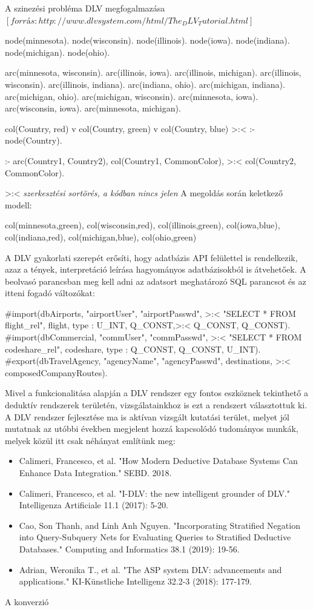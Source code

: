 A szinezési probléma DLV  megfogalmazása $[forrás: http://www.dlvsystem.com/html/The_DLV_Tutorial.html]$
\begin{cpp}
node(minnesota).
node(wisconsin).
node(illinois).
node(iowa).
node(indiana).
node(michigan).
node(ohio).

arc(minnesota, wisconsin).
arc(illinois, iowa).
arc(illinois, michigan).
arc(illinois, wisconsin).
arc(illinois, indiana).
arc(indiana, ohio).
arc(michigan, indiana).
arc(michigan, ohio).
arc(michigan, wisconsin).
arc(minnesota, iowa).
arc(wisconsin, iowa).
arc(minnesota, michigan).

col(Country, red) v col(Country, green) v col(Country, blue) >:<
 :- node(Country).

:- arc(Country1, Country2), col(Country1, CommonColor), >:<
col(Country2, CommonColor). 
\end{cpp}
>:<\textit{ szerkesztési sortörés, a kódban nincs jelen}
A megoldás során keletkező modell:
\begin{cpp}
{col(minnesota,green), col(wisconsin,red), col(illinois,green),
 col(iowa,blue), col(indiana,red), col(michigan,blue), col(ohio,green)}
\end{cpp}
A DLV gyakorlati szerepét erősíti, hogy adatbázis  API  felülettel is rendelkezik, azaz a tények, interpretáció leírása hagyományos adatbázisokból is átvehetőek.  A beolvasó parancsban meg kell adni az adatsort meghatározó SQL parancsot és az itteni fogadó változókat:
\begin{cpp}
#import(dbAirports, "airportUser", "airportPasswd", >:< 
"SELECT * FROM flight_rel", flight, type : U_INT, Q_CONST,>:<
 Q_CONST, Q_CONST).
#import(dbCommercial, "commUser", "commPasswd", >:< 
"SELECT * FROM codeshare_rel", codeshare, type : Q_CONST, Q_CONST, U_INT).
#export(dbTravelAgency, "agencyName", "agencyPasswd", destinations, >:<
composedCompanyRoutes).

\end{cpp}
Mivel a  funkcionalitása alapján a  DLV rendszer egy fontos eszköznek tekinthető a deduktív rendszerek területén, vizsgálatainkhoz is ezt a rendszert választottuk ki.  
A DLV rendszer fejlesztése ma is aktívan vizsgált kutatási terület, melyet jól mutatnak az utóbbi években megjelent hozzá kapcsolódó tudományos munkák, melyek közül itt csak néhányat említünk meg:
\begin{itemize}
\item	Calimeri, Francesco, et al. "How Modern Deductive Database Systems Can Enhance Data Integration." SEBD. 2018.
\item Calimeri, Francesco, et al. "I-DLV: the new intelligent grounder of DLV." Intelligenza Artificiale 11.1 (2017): 5-20.
\item Cao, Son Thanh, and Linh Anh Nguyen. "Incorporating Stratified Negation into Query-Subquery Nets for Evaluating Queries to Stratified Deductive Databases." Computing and Informatics 38.1 (2019): 19-56.
\item Adrian, Weronika T., et al. "The ASP system DLV: advancements and applications." KI-Künstliche Intelligenz 32.2-3 (2018): 177-179.
\end{itemize}
A konverzió

